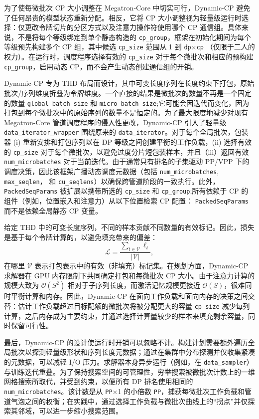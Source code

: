 为了使每微批次 CP 大小调整在 Megatron-Core 中切实可行，Dynamic-CP 避免了任何昂贵的模型状态重新分配。相反，它将 CP 大小调整视为轻量级运行时选择：仅更改令牌切片的分区方式以及注意力操作符使用哪个 CP 通信组。具体来说，不是将每个等级绑定到单个静态构造的 \texttt{cp\_group}，框架在初始化期间为每个等级预先构建多个 CP 组，其中候选 \texttt{cp\_size} 范围从 1 到 \texttt{dp}$\times$\texttt{cp} （仅限于二人的权力）。在运行时，调度程序选择有效的 \texttt{cp\_size} 对于每个微批次和相应的预构建 \texttt{cp\_group}，启用动态 CP，而不会产生动态创建通信组的开销。

Dynamic-CP 专为 THD 布局而设计，其中可变长度序列在长度约束下打包，原始批次/序列维度折叠为令牌维度。一个直接的结果是微批次的数量不再是一个固定的数量 \texttt{global\_batch\_size} 和 \texttt{micro\_batch\_size};它可能会因迭代而变化，因为打包到每个微批次中的原始序列的数量不是恒定的。为了最大限度地减少对现有 Megatron-Core 管道调度程序的侵入性更改，Dynamic-CP 引入了轻量级 \texttt{data\_iterator\_wrapper} 围绕原来的 \texttt{data\_iterator}。对于每个全局批次，包装器 (i) 重新安排和打包序列以在 DP 等级之间创建平衡的工作负载，(ii) 选择有效的 \texttt{cp\_size} 对于每个微批次，以避免过度分片短包装样本，并且（iii）返回有效 \texttt{num\_microbatches} 对于当前迭代。由于通常只有排名的子集驱动 PP/VPP 下的调度决策，因此该框架广播动态调度元数据（包括 \texttt{num\_microbatches}, \texttt{max\_seqlen}， 和 \texttt{cu\_seqlens}）以确保跨管道阶段的一致执行。此外， \texttt{PackedSeqParams} 被扩展以携带所选的 \texttt{cp\_size} 和 \texttt{cp\_group};所有依赖于 CP 的组件（例如，位置嵌入和注意力）从以下位置检索 CP 配置： \texttt{PackedSeqParams} 而不是依赖全局静态 CP 变量。

给定 THD 中的可变长度序列，不同的样本贡献不同数量的有效标记。因此，损失是基于每个令牌计算的，以避免填充带来的偏差：
\begin{equation}
\mathcal{L} = \frac{\sum_{t\in \mathcal{V}} \ell_t}{|\mathcal{V}|},
\end{equation}
在哪里 $\mathcal{V}$ 表示打包表示中的有效（非填充）标记集。在规划方面，Dynamic-CP 求解器在 GPU 内存限制下共同确定打包和每微批次 CP 大小。由于注意力计算的规模大致为 $\mathcal{O}(S^2)$ 相对于子序列长度，而激活记忆规模更接近 $\mathcal{O}(S)$，很难同时平衡计算和内存。因此，Dynamic-CP 在面向工作负载和面向内存的决策之间交替：估计工作负载超过目标配额的微批次将被分配更大的容量 \texttt{cp\_size} 减少每列计算，之后内存成为主要约束，并通过选择计算量较少的样本来填充剩余容量，同时保留可行性。

最后，Dynamic-CP 的设计使运行时开销可以忽略不计。构建计划需要额外遍历全局批次以探测轻量级形状和序列长度元数据；通过在集群中分布探测并仅收集紧凑的元数据，可以减轻 I/O 压力。求解器本身异步运行（例如，在 \texttt{data\_sampler}）与训练迭代重叠。为了保持搜索空间的可管理性，穷举搜索被微批次计数上的一维网格搜索所取代，并受到约束，以便所有 DP 排名使用相同的 \texttt{num\_microbatches}。该计数是从 \texttt{PP}$\times$1 的小倍数 \texttt{PP}，捕获每微批次工作负载和管道气泡之间的权衡；在实践中，通过选择工作负载与微批次曲线上的“拐点”并仅探索其邻域，可以进一步缩小搜索范围。


